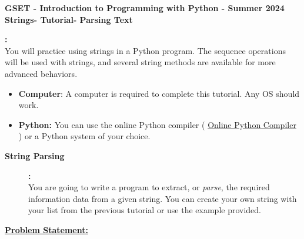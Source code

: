 \documentclass[12pt]{article}
\newcommand{\MNUM}{5} %
\newcommand{\MNAME}{Strings} %
\newcommand{\TNAME}{Parsing Text} %
\newcommand{\SEM}{Summer 2024}
\begin{document}
\thispagestyle{plain}

\begin{center}
   {\bf \large GSET - Introduction to Programming with Python - \SEM} \vspace{5mm}\\
   {\bf \Large \MNAME \hspc -  Tutorial\hspc\MNUM\hspc - \TNAME}\vspace{3mm}\\
   
\end{center}


\begin{description}[labelindent=1cm]
	
	\item [\textbf{ \Large Overview}] \textbf{ \Large :}\\
	You will practice using strings in a Python program. The sequence operations will be used with strings, and several string methods are available for more advanced behaviors. 	
	\item[\textbf{\underline{System Requirements:}}] \hfill \vspace{0mm}

\begin{itemize}
	\item {\bf Computer}: A computer is required to complete this tutorial. Any OS should work.
	\item {\bf Python:} You can use the online Python compiler ( \href{https://www.online-python.com/online_python_compiler}{Online Python Compiler}  ) or a Python system of your choice.
\end{itemize}

	\item[\textbf{\underline{Background:}}] \hfill \vspace{0mm}
	
	\begin{description}

	 	\item [\textbf{String Parsing }] \textbf{ \Large :}\\   

            You are going to write a program to extract, or {\it parse}, the required information data from a given string. You can create your own string with your list from the previous tutorial or use the example provided. 
      
   \item[\textbf{\underline{Problem Statement:}}] \hfill \vspace{0mm}


\end{description}
\end{description}
\end{document}
